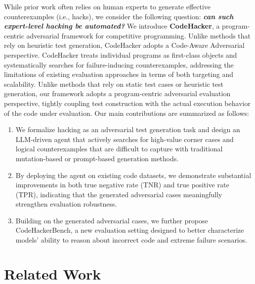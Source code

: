 \documentclass[11pt]{article}
\begin{document}
While prior work often relies on human experts to generate effective counterexamples (i.e., hacks), we consider the following question: \textbf{\textit{can such expert-level hacking be automated?}}
We introduce \textbf{CodeHacker}, a program-centric adversarial framework for competitive programming. 
Unlike methods that rely on heuristic test generation, CodeHacker adopts a Code-Aware Adversarial perspective. CodeHacker treats individual programs as first-class objects and systematically searches for failure-inducing counterexamples, addressing the limitations of existing evaluation approaches in terms of both targeting and scalability. Unlike methods that rely on static test cases or heuristic test generation, our framework adopts a program-centric adversarial evaluation perspective, tightly coupling test construction with the actual execution behavior of the code under evaluation. Our main contributions are summarized as follows:
\begin{enumerate}
    \item We formalize hacking as an adversarial test generation task and design an LLM-driven agent that actively searches for high-value corner cases and logical counterexamples that are difficult to capture with traditional mutation-based or prompt-based generation methods.

    \item By deploying the agent on existing code datasets, we demonstrate substantial improvements in both true negative rate (TNR) and true positive rate (TPR), indicating that the generated adversarial cases meaningfully strengthen evaluation robustness.
    
    \item Building on the generated adversarial cases, we further propose CodeHackerBench, a new evaluation setting designed to better characterize models’ ability to reason about incorrect code and extreme failure scenarios.
\end{enumerate}



\section{Related Work}
\end{document}
